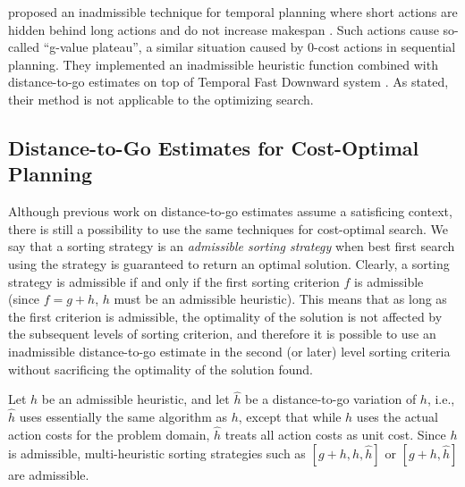  proposed an inadmissible technique for temporal planning where short actions are
hidden behind long actions and do not increase makespan \cite{benton2010g}. Such actions cause so-called ``g-value
plateau'', a similar situation caused by 0-cost actions in sequential planning.  They implemented an inadmissible
heuristic function combined with distance-to-go estimates on top of Temporal Fast Downward system
\cite{eyerich2009using}.  As stated, their method is not applicable to the optimizing search.


\subsection{Distance-to-Go Estimates for Cost-Optimal Planning}

Although previous work on distance-to-go estimates assume a satisficing context,
there is still a possibility to use the same techniques for cost-optimal search.
We say that a sorting strategy is an \emph{admissible sorting strategy}
when best first search using the strategy is guaranteed to return an optimal solution.
Clearly, a sorting strategy is admissible if and only if the 
first sorting criterion $f$ is admissible (since $f=g+h$, $h$ must be an admissible heuristic).
This means that as long as the first criterion is admissible, the optimality of the solution is not affected by the
subsequent levels of sorting criterion, and therefore it is possible to use an inadmissible distance-to-go estimate
in the second (or later) level sorting criteria without sacrificing the optimality of the solution found.

Let $h$ be an admissible heuristic, and
let $\hat{h}$ be a distance-to-go variation of $h$, i.e., $\hat{h}$ uses essentially the same algorithm as $h$, except that while $h$ uses the actual action costs for the problem domain, $\hat{h}$ treats all action costs as unit cost.
Since $h$ is admissible, multi-heuristic sorting strategies such as $[g+h,h,\hat{h}]$ or $[g+h,\hat{h}]$
are admissible.

